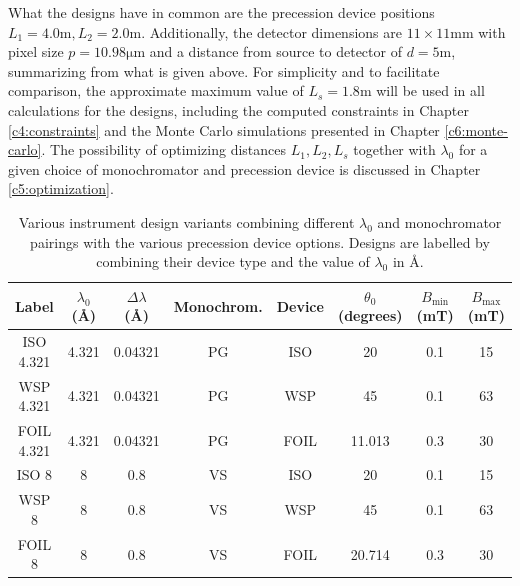 \documentclass{article}
\begin{document}
What the designs have in common are the precession device positions $L_1 = 4.0\unit{\meter}, L_2 = 2.0\unit{\meter}$. Additionally, the detector dimensions are $11\times 11\unit{\milli\meter}$ with pixel size $p = 10.98 \unit{\micro\meter}$ and a distance from source to detector of $d = 5\unit\meter$, summarizing from what is given above. For simplicity and to facilitate comparison, the approximate maximum value of $L_s = 1.8\unit{\meter}$ will be used in all calculations for the designs, including the computed constraints in Chapter \ref{c4:constraints} and the Monte Carlo simulations presented in Chapter \ref{c6:monte-carlo}. The possibility of optimizing distances $L_1, L_2, L_s$ together with $\lambda_0$ for a given choice of monochromator and precession device is discussed in Chapter \ref{c5:optimization}.  


\begin{table}[h!]
	\centering
	\begin{tabular}{|c|c|c|c|c|c|c|c|}
		\hline
		Label & $\lambda_0$ (Å) & $\Delta\lambda$ (Å) & Monochrom. & Device & $\theta_0$ (degrees) & $B_{\text{min}}$ (mT) & $B_{\text{max}}$ (mT) \\
		\hline
		ISO 4.321 & 4.321 & 0.04321 & PG & ISO & 20 & 0.1 & 15 \\
		WSP 4.321 & 4.321 & 0.04321 & PG & WSP & 45 & 0.1 & 63 \\
		FOIL 4.321 & 4.321 & 0.04321 & PG & FOIL & 11.013 & 0.3 & 30 \\
		ISO 8 & 8 & 0.8 & VS & ISO & 20 & 0.1 & 15 \\
		WSP 8 & 8 & 0.8 & VS & WSP & 45 & 0.1 & 63 \\
		FOIL 8 & 8 & 0.8 & VS & FOIL & 20.714 & 0.3 & 30 \\
		\hline
	\end{tabular}
	\caption{Various instrument design variants combining different $\lambda_0$ and monochromator pairings with the various precession device options. Designs are labelled by combining their device type and the value of $\lambda_0$ in Å.}
	\label{tab:design-variants}
\end{table}




\end{document}
